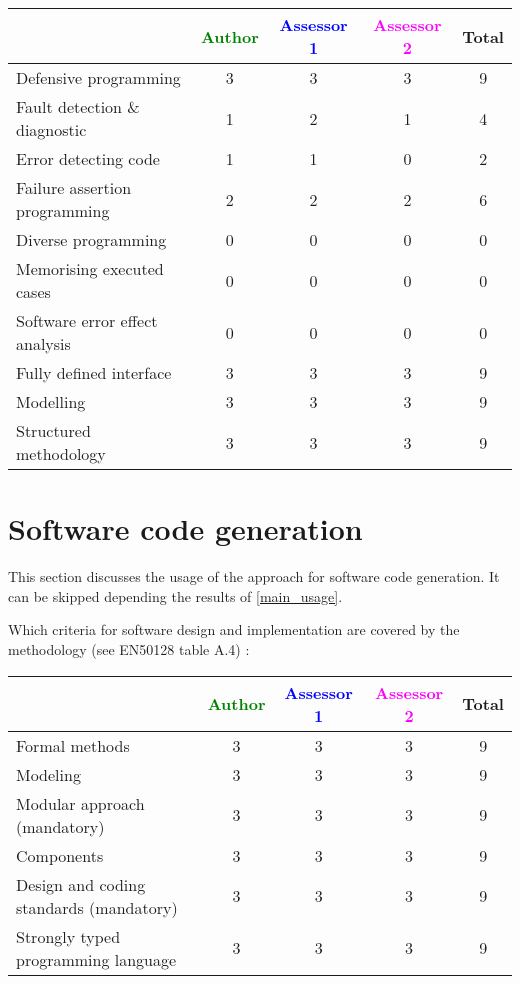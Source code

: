\begin{tabular}{|l | c | c | c | c|}
\hline
& \textcolor{green}{Author} & \textcolor{blue}{Assessor 1} & \textcolor{magenta}{Assessor 2} & Total \\
\hline
Defensive programming  & 3 & 3 & 3 & 9 \\
\hline 
Fault detection \& diagnostic  & 1 & 2 & 1 & 4 \\
\hline
Error detecting code  & 1 & 1 & 0 & 2 \\
\hline
Failure assertion programming & 2  & 2 & 2 & 6 \\
\hline
Diverse programming & 0 & 0 & 0 & 0 \\
\hline
Memorising executed cases & 0 & 0 & 0 & 0 \\
\hline
Software error effect analysis & 0 & 0 & 0 & 0 \\
\hline
Fully defined interface & 3 & 3 & 3 & 9 \\
\hline
Modelling  & 3 & 3 & 3 & 9 \\
\hline
Structured methodology & 3 & 3 & 3 & 9 \\
\hline
\end{tabular}

\section{Software code generation}
This section discusses the usage of the approach for software code generation.
It can be skipped depending the results of \ref{main_usage}.

Which criteria for software design and implementation are covered by the methodology
(see EN50128 table A.4) :

\begin{tabular}{|l | c | c | c | c|}
\hline
& \textcolor{green}{Author} & \textcolor{blue}{Assessor 1} & \textcolor{magenta}{Assessor 2} & Total \\
\hline
Formal methods  & 3 & 3 & 3 & 9 \\
\hline 
Modeling  & 3 & 3 & 3 & 9 \\
\hline
Modular approach (mandatory) & 3 & 3 & 3 & 9 \\
\hline
Components & 3 & 3 & 3 & 9 \\
\hline
Design and coding standards (mandatory) & 3 & 3 & 3 & 9 \\
\hline
Strongly typed programming language & 3 & 3 & 3 & 9 \\
\hline

\end{tabular}



